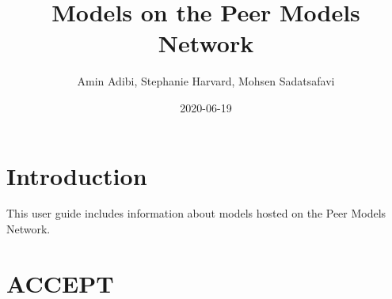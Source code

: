 \documentclass[
]{book}
\title{Models on the Peer Models Network}
\author{Amin Adibi, Stephanie Harvard, Mohsen Sadatsafavi}
\date{2020-06-19}
\begin{document}
\maketitle

{
\setcounter{tocdepth}{1}
\tableofcontents
}
\hypertarget{introduction}{%
\chapter{Introduction}\label{introduction}}

This user guide includes information about models hosted on the Peer Models Network.

\hypertarget{accept}{%
\chapter{ACCEPT}\label{accept}}
\end{document}
